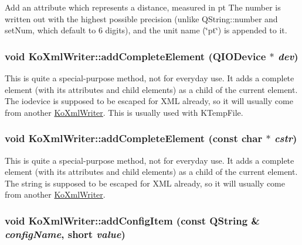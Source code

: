 Add an attribute which represents a distance, measured in pt The number is written out with the highest possible precision (unlike QString::number and setNum, which default to 6 digits), and the unit name (\char`\"{}pt\char`\"{}) is appended to it. \hypertarget{classKoXmlWriter_0bc25d326f56ee58c095d2e6287d6b7d}{
\subsubsection[{addCompleteElement}]{\setlength{\rightskip}{0pt plus 5cm}void KoXmlWriter::addCompleteElement (QIODevice $\ast$ {\em dev})}}
\label{classKoXmlWriter_0bc25d326f56ee58c095d2e6287d6b7d}


This is quite a special-purpose method, not for everyday use. It adds a complete element (with its attributes and child elements) as a child of the current element. The iodevice is supposed to be escaped for XML already, so it will usually come from another \hyperlink{classKoXmlWriter}{KoXmlWriter}. This is usually used with KTempFile. \hypertarget{classKoXmlWriter_cc98c1f1d995a792c7a0e4b2945954ff}{
\subsubsection[{addCompleteElement}]{\setlength{\rightskip}{0pt plus 5cm}void KoXmlWriter::addCompleteElement (const char $\ast$ {\em cstr})}}
\label{classKoXmlWriter_cc98c1f1d995a792c7a0e4b2945954ff}


This is quite a special-purpose method, not for everyday use. It adds a complete element (with its attributes and child elements) as a child of the current element. The string is supposed to be escaped for XML already, so it will usually come from another \hyperlink{classKoXmlWriter}{KoXmlWriter}. \hypertarget{classKoXmlWriter_517c0ff99e13b5f20df48b9b49bffcca}{
\subsubsection[{addConfigItem}]{\setlength{\rightskip}{0pt plus 5cm}void KoXmlWriter::addConfigItem (const QString \& {\em configName}, \/  short {\em value})}}
\label{classKoXmlWriter_517c0ff99e13b5f20df48b9b49bffcca}


